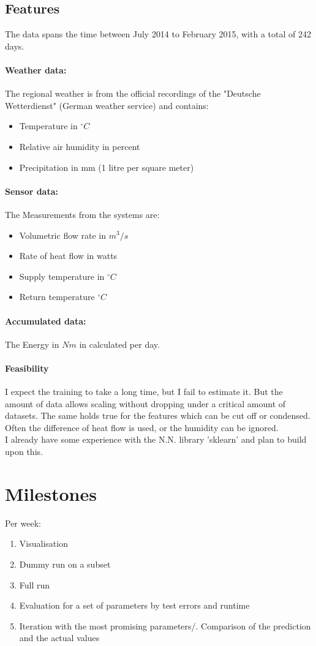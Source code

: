 \documentclass[	DIV=calc,%
				paper=a4,%
				fontsize=11pt,%
				twocolumn]{scrartcl}	 %
\begin{document}
\subsection{Features}
The data spans the time between July 2014 to February 2015, with a total of 242 days.

\paragraph{Weather data:}
The regional weather is from the official recordings of the "Deutsche Wetterdienst" (German weather service) and contains:

\begin{itemize}
\item Temperature in $^\circ C$
\item Relative air humidity in percent
\item Precipitation in mm (1 litre per square meter)
\end{itemize}

\paragraph{Sensor data:}
The Measurements from the systems are:

\begin{itemize}
\item Volumetric flow rate in $m^3 / s$
\item Rate of heat flow in watts
\item Supply temperature in $^\circ C$
\item Return temperature $^\circ C$
\end{itemize}

\paragraph{Accumulated data:}
The Energy in $Nm$ in calculated per day.

\paragraph{Feasibility}
I expect the training to take a long time, but I fail to estimate it. But the amount of data allows scaling without dropping under a critical amount of datasets. The same holds true for the features which can be cut off or condensed. Often the difference of heat flow is used, or the humidity can be ignored.\\
I already have some experience with the N.N. library 'sklearn' and plan to build upon this.
\section{Milestones}
Per week:
\begin{enumerate}
\item Visualisation
\item Dummy run on a subset
\item Full run
\item Evaluation for a set of parameters by test errors and runtime
\item Iteration with the most promising parameters/. Comparison of the prediction and the actual values
\end{enumerate}
\end{document}
